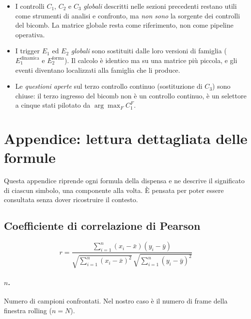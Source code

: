 \documentclass[a4paper,11pt]{article}
\begin{document}
\begin{itemize}[nosep]
  \item I controlli $C_1$, $C_2$ e $C_3$ \emph{globali} descritti nelle
        sezioni precedenti restano utili come strumenti di analisi e
        confronto, ma \emph{non sono} la sorgente dei controlli del
        bicomb. La matrice globale resta come riferimento, non come
        pipeline operativa.
  \item I trigger $E_1$ ed $E_2$ \emph{globali} sono sostituiti dalle
        loro versioni di famiglia ($E_1^{\text{dinamica}}$ e
        $E_2^{\text{forma}}$). Il calcolo è identico ma su una matrice
        più piccola, e gli eventi diventano localizzati alla famiglia
        che li produce.
  \item Le \emph{questioni aperte} sul terzo controllo continuo
        (sostituzione di $C_3$) sono chiuse: il terzo ingresso del
        bicomb non è un controllo continuo, è un selettore a cinque
        stati pilotato da $\arg\max_F C_1^F$.
\end{itemize}

\section{Appendice: lettura dettagliata delle formule}

Questa appendice riprende ogni formula della dispensa e ne descrive il
significato di ciascun simbolo, una componente alla volta. È pensata per
poter essere consultata senza dover ricostruire il contesto.

\subsection{Coefficiente di correlazione di Pearson}

\[
r = \frac{\sum_{i=1}^{n} (x_i - \bar x)(y_i - \bar y)}
         {\sqrt{\sum_{i=1}^{n} (x_i - \bar x)^2}\,
          \sqrt{\sum_{i=1}^{n} (y_i - \bar y)^2}}
\]

\paragraph{$n$.} Numero di campioni confrontati. Nel nostro caso è il
numero di frame della finestra rolling ($n = N$).
\end{document}
